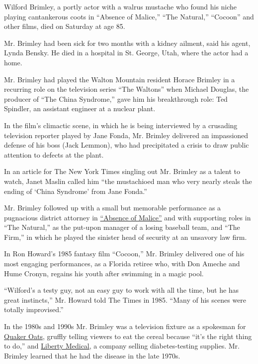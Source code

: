 Wilford Brimley, a portly actor with a walrus mustache who found his
niche playing cantankerous coots in ``Absence of Malice,'' ``The
Natural,'' ``Cocoon'' and other films, died on Saturday at age 85.

Mr. Brimley had been sick for two months with a kidney ailment, said his
agent, Lynda Bensky. He died in a hospital in St. George, Utah, where
the actor had a home.

Mr. Brimley had played the Walton Mountain resident Horace Brimley in a
recurring role on the television series ``The Waltons'' when Michael
Douglas, the producer of ``The China Syndrome,'' gave him his
breakthrough role: Ted Spindler, an assistant engineer at a nuclear
plant.

In the film's climactic scene, in which he is being interviewed by a
crusading television reporter played by Jane Fonda, Mr. Brimley
delivered an impassioned defense of his boss (Jack Lemmon), who had
precipitated a crisis to draw public attention to defects at the plant.

In an article for The New York Times singling out Mr. Brimley as a
talent to watch, Janet Maslin called him ``the mustachioed man who very
nearly steals the ending of `China Syndrome' from Jane Fonda.''

Mr. Brimley followed up with a small but memorable performance as a
pugnacious district attorney in
\href{https://www.youtube.com/watch?v=btqBJJF2yvE}{``Absence of
Malice''} and with supporting roles in ``The Natural,'' as the put-upon
manager of a losing baseball team, and ``The Firm,'' in which he played
the sinister head of security at an unsavory law firm.

In Ron Howard's 1985 fantasy film ``Cocoon,'' Mr. Brimley delivered one
of his most engaging performances, as a Florida retiree who, with Don
Ameche and Hume Cronyn, regains his youth after swimming in a magic
pool.

``Wilford's a testy guy, not an easy guy to work with all the time, but
he has great instincts,'' Mr. Howard told The Times in 1985. ``Many of
his scenes were totally improvised.''

In the 1980s and 1990s Mr. Brimley was a television fixture as a
spokesman for \href{https://www.youtube.com/watch?v=GOLXnkbfEuo}{Quaker
Oats}, gruffly telling viewers to eat the cereal because ``it's the
right thing to do,'' and
\href{https://www.youtube.com/watch?v=1K93EPoO7is}{Liberty Medical}, a
company selling diabetes-testing supplies. Mr. Brimley learned that he
had the disease in the late 1970s.

